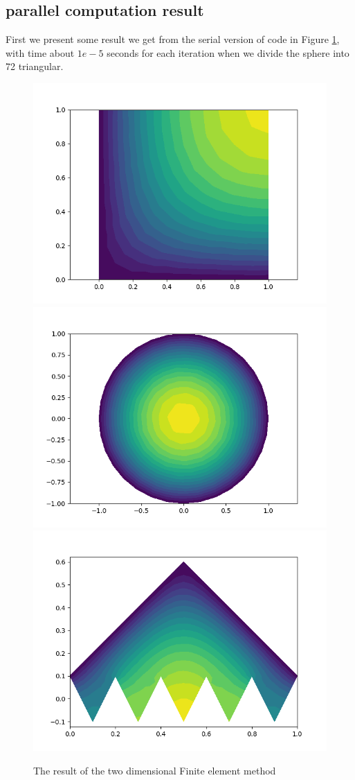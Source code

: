 \documentclass[11pt]{article}
\begin{document}
\subsection{parallel computation result}
First we present some result we get from the serial version of code in Figure \ref{fig:2D_result}, with time about $1e-5$ seconds for each iteration when we divide the sphere into 72 triangular.
\begin{figure}
    \centering
    \includegraphics[width=0.3\linewidth]{../CPP_code/2D_problem/cpp_code/serial_version/square/result.png}
    \includegraphics[width=0.3\linewidth]{../CPP_code/2D_problem/cpp_code/serial_version/sphere/result.png}
    \includegraphics[width=0.3\linewidth]{../CPP_code/2D_problem/cpp_code/serial_version/test3/result.png}
    \caption{The result of the two dimensional Finite element method}
    \label{fig:2D_result}
\end{figure}
\end{document}
